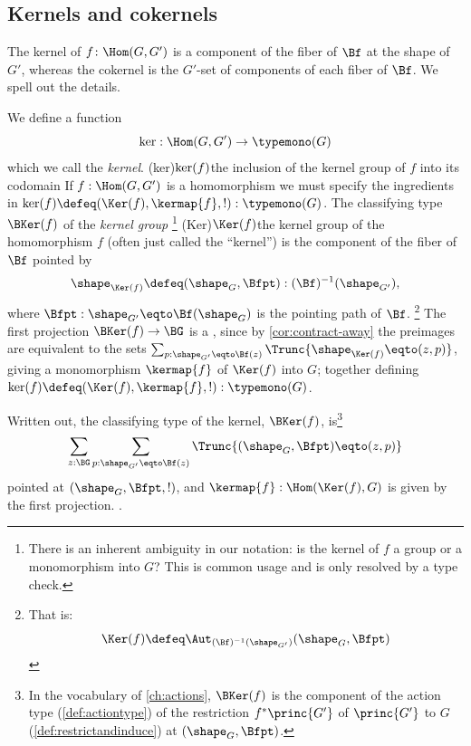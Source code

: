 \subsection{Kernels and cokernels}
The kernel of $f\colon\Hom(G,G')$ is a component of the fiber of $\Bf$
at the shape of $G'$,
whereas the cokernel is the $G'$-set of components of each fiber of $\Bf$.
We spell out the details.
\label{sec:kerandcoker}
\begin{definition}
  \label{def:kernel}
  We define a function
  \[
    \ker:\Hom(G,G')\to\typemono(G)
  \]
  which we call the \emph{kernel}.%
  \glossary(ker){$\protect\ker(f)$}{the inclusion of the kernel group of $f$
    into its codomain}
  If $f:\Hom(G,G')$  is a homomorphism we must specify the ingredients in
  $\ker(f)\defeq(\Ker(f),\kermap{f},!):\typemono(G)$.
  The classifying type $\BKer(f)$ of the \emph{kernel group}%
  \footnote{There is an inherent ambiguity in our notation:
    is the kernel of $f$ a group or a monomorphism into $G$?
    This is common usage and is only resolved by a type check.}%
  \glossary(Ker){$\protect\Ker(f)$}{the kernel group of the homomorphism $f$}
  (often just called the ``kernel'') is the component of the fiber of $\Bf$ pointed by
  \[
    \sh_{\Ker(f)}\defeq(\sh_G,\Bfpt):(\Bf)^{-1}(\sh_{G'}),
  \]
  where $\Bfpt:\sh_{G'}\eqto \Bf(\sh_G)$ is the pointing path of $\Bf$.%
\footnote{That is:
    \[
      \Ker(f)\defeq \Aut_{(\Bf)^{-1}(\sh_{G'})}(\sh_G,\Bfpt)
    \]}
  The first projection $\BKer(f)\to \BG$ is a \covering,
  since by \cref{cor:contract-away} the preimages are equivalent to the sets
  $\sum_{p:\sh_{G'}\eqto\Bf(z)}\Trunc{\sh_{\Ker(f)}\eqto(z,p)}$,
  giving a monomorphism $\kermap{f}$ of $\Ker(f)$ into $G$;
  together defining $\ker(f)\defeq(\Ker(f),\kermap{f},!):\typemono(G)$.
\end{definition}

Written out, the classifying type of the kernel, $\BKer(f)$, is\footnote{%
In the vocabulary of \cref{ch:actions}, $\BKer(f)$ is the component of
the action type (\cref{def:actiontype}) of the restriction $f^*\princ{G'}$ of
$\princ{G'}$ to $G$ (\cref{def:restrictandinduce}) at $(\sh_G,\Bfpt)$.
}
\[
  \sum_{z:\BG}\sum_{p:\sh_{G'}\eqto \Bf(z)}\Trunc{(\sh_G,\Bfpt)\eqto(z,p)}
\]
pointed at $(\sh_G,\Bfpt,!)$, 
and $\kermap{f}:\Hom(\Ker(f), G)$ is given by the first projection.
.

